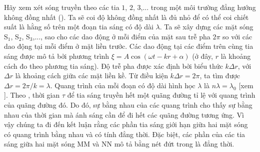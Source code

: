 Hãy xem xét sóng truyền theo các tia $1$, $2$, $3$,... trong một môi trường đẳng hướng không đồng nhất ().
Ta sẽ coi độ không đồng nhất là đủ nhỏ để có thể coi chiết suất là hằng số trên một đoạn tia sáng có độ dài $\lambda$.
Ta sẽ xây dựng các mặt sóng S$_1$, S$_2$, S$_3$,..., sao cho các dao động ở mỗi điểm của mặt sau trễ pha $2\pi$ so với các dao động tại mỗi điểm ở mặt liền trước.
Các dao động tại các điểm trên cùng tia sáng được mô tả bởi phương trình $\xi=A\cos(\omega t - kr + \alpha)$ (ở đây, $r$ là khoảng cách đo theo phương tia sáng).
Độ trễ pha được xác định bởi biểu thức $k\Delta{r}$, với $\Delta{r}$ là khoảng cách giữa các mặt liền kề.
Từ điều kiện $k\Delta{r}=2\pi$, ta tìm được $\Delta{r}=2\pi/k=\lambda$.
Quang trình của mỗi đoạn có độ dài hình học $\lambda$ là $n\lambda=\lambda_0$ [xem ].
Theo , thời gian $\tau$ để tia sáng truyền hết một quãng đường tỉ lệ với quang trình của quãng đường đó.
Do đó, sự bằng nhau của các quang trình cho thấy sự bằng nhau của thời gian mà ánh sáng cần để đi hết các quãng đường tương ứng.
Vì vậy chúng ta đi đến kết luận rằng các phần tia sáng giới hạn giữa hai mặt sóng có quang trình bằng nhau và có tính đẳng thời.
Đặc biệt, các phần của các tia sáng giữa hai mặt sóng MM và NN mô tả bằng nét đứt trong  là đẳng thời.

